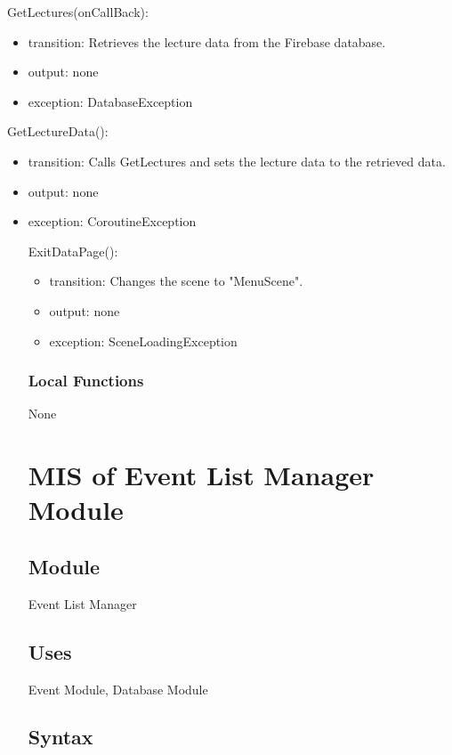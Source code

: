 \documentclass[12pt, titlepage]{article}
\begin{document}
\noindent GetLectures(onCallBack):
\begin{itemize}
\item transition: Retrieves the lecture data from the Firebase database.
\item output: none
\item exception: DatabaseException
\end{itemize}

\noindent GetLectureData():
\begin{itemize}
\item transition: Calls GetLectures and sets the lecture data to the retrieved data.
\item output: none
\item exception: CoroutineException

\noindent ExitDataPage():
\begin{itemize}
\item transition: Changes the scene to "MenuScene".
\item output: none
\item exception: SceneLoadingException
\end{itemize}

\subsubsection{Local Functions}

None

\newpage

\section{MIS of Event List Manager Module} \label{mEL}

\subsection{Module}

Event List Manager

\subsection{Uses}

Event Module, Database Module

\subsection{Syntax}


\end{itemize}
\end{document}
